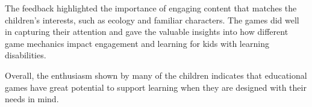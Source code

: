The feedback highlighted the importance of engaging content that matches the children’s interests, such as ecology and familiar characters. The games did well in capturing their attention and gave the valuable insights into how different game mechanics impact engagement and learning for kids with learning disabilities.

Overall, the enthusiasm shown by many of the children indicates that educational games have great potential to support learning when they are designed with their needs in mind.

